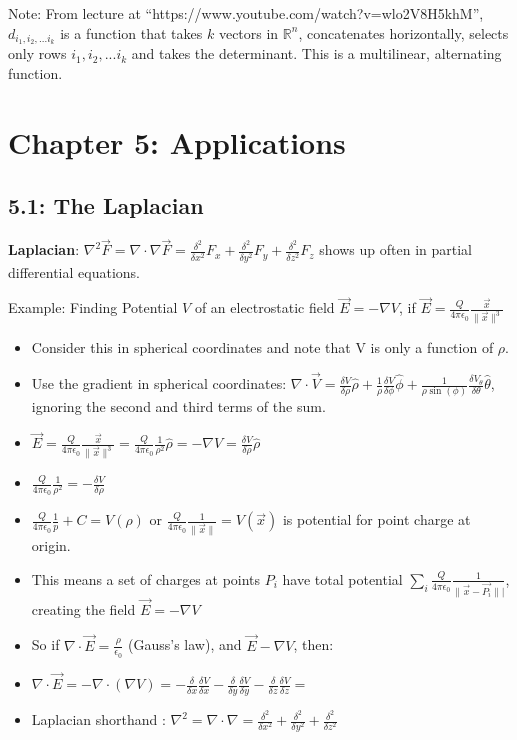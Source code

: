 \documentclass[11pt, oneside]{article}   	%
\begin{document}
Note: From lecture at ``https://www.youtube.com/watch?v=wlo2V8H5khM'', $d_{i_1, i_2, ... i_k}$ is a function that takes $k$ vectors in $\mathbb{R}^n$, concatenates horizontally, selects only rows $i_1, i_2, ... i_k$ and takes the determinant.  This is a multilinear, alternating function.

\section{Chapter 5: Applications}
\subsection{5.1: The Laplacian}

\textbf{Laplacian}: $\nabla^2 \vec{F} = \nabla \cdot \nabla \vec{F} = \frac{\delta^2}{\delta x^2}F_x + \frac{\delta^2}{\delta y^2}F_y + \frac{\delta^2}{\delta z^2}F_z$ shows up often in partial differential equations.  

 Example: Finding Potential $V$ of an electrostatic field $\vec{E} = -\nabla V$, if $\vec{E} = \frac{Q}{4\pi\epsilon_0}\frac{\vec{x}}{\|\vec{x}\|^3}$
\begin{itemize}
\item Consider this in spherical coordinates and note that V is only a function of $\rho$.
\item Use the gradient in spherical coordinates: $\nabla \cdot \vec{V} = \frac{\delta V}{\delta\rho} \hat{\rho} + \frac{1}{\rho}\frac{\delta V}{\delta \phi} \hat{\phi} + \frac{1}{\rho \sin(\phi)} \frac{\delta V_{\theta}}{\delta \theta}\hat{\theta}$, ignoring the second and third terms of the sum.
\item  $\vec{E} = \frac{Q}{4\pi\epsilon_0}\frac{\vec{x}}{\|\vec{x}\|^3} =  \frac{Q}{4\pi\epsilon_0}\frac{1}{\rho^2}\hat{\rho} = -\nabla V = \frac{\delta V}{\delta\rho} \hat{\rho}$
\item $\frac{Q}{4\pi\epsilon_0}\frac{1}{\rho^2} = -\frac{\delta V}{\delta \rho}$
\item $\frac{Q}{4\pi\epsilon_0}\frac{1}{p} + C = V(\rho)$ or $\frac{Q}{4\pi\epsilon_0}\frac{1}{\|\vec{x}\|} = V(\vec{x})$ is potential for point charge at origin.
\item This means a set of charges at points $P_i$ have total potential $\sum_i \frac{Q}{4\pi\epsilon_0}\frac{1}{\|\vec{x} - \vec{P_i}\||}$, creating the field $\vec{E} = -\nabla V$
\item So if $\nabla \cdot \vec{E} = \frac{\rho}{\epsilon_0}$ (Gauss's law), and $\vec{E} -\nabla V$, then:
\item $\nabla \cdot \vec{E} = -\nabla \cdot (\nabla V) = -\frac{\delta}{\delta x}\frac{\delta V}{\delta x} - \frac{\delta}{\delta y}\frac{\delta V}{\delta y} -\frac{\delta}{\delta z}\frac{\delta V}{\delta z} =$ 
\item   Laplacian shorthand : $\nabla^2 = \nabla \cdot \nabla = \frac{\delta^2}{\delta x^2} +  \frac{\delta^2}{\delta y^2} +  \frac{\delta^2}{\delta z^2}$
\end{itemize}
\end{document}
